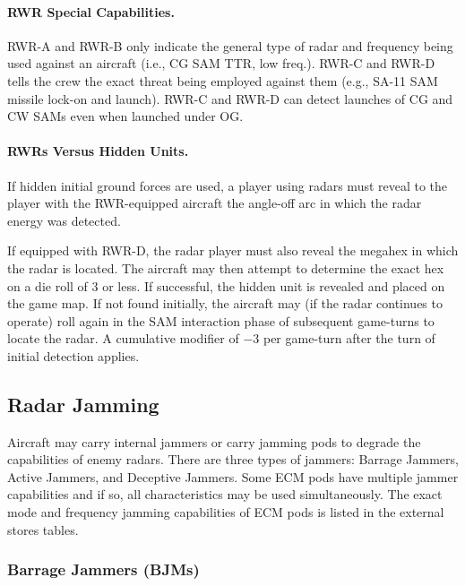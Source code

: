 \paragraph{RWR Special Capabilities.} RWR-A and RWR-B only indicate the general type of radar and frequency being used against an aircraft (i.e., CG SAM TTR, low freq.). RWR-C and RWR-D tells the crew the exact threat being employed against them (e.g., SA-11 SAM missile lock-on and launch). RWR-C and RWR-D can detect launches of CG and CW SAMs even when launched under OG.

\paragraph{RWRs Versus Hidden Units.} If hidden initial ground forces are used, a player using radars must reveal to the player with the RWR-equipped aircraft the angle-off arc in which the radar energy was detected.

If equipped with RWR-D, the radar player must also reveal the megahex in which the radar is located. The aircraft may then attempt to determine the exact hex on a die roll of 3 or less. If successful, the hidden unit is revealed and placed on the game map. If not found initially, the aircraft may (if the radar continues to operate) roll again in the SAM interaction phase of subsequent game-turns to locate the radar. A cumulative modifier of $-3$ per game-turn after the turn of initial detection applies.

\subsection{Radar Jamming}

Aircraft may carry internal jammers or carry jamming pods to degrade the capabilities of enemy radars. There are three types of jammers: Barrage Jammers, Active Jammers, and Deceptive Jammers. Some ECM pods have multiple jammer capabilities and if so, all characteristics may be used simultaneously. The exact mode and frequency jamming capabilities of ECM pods is listed in the external stores tables. 


\subsubsection{Barrage Jammers (BJMs)}

